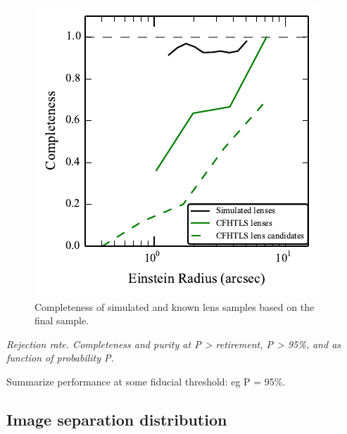 \documentclass[useAMS,usenatbib,a4paper]{mn2e}
\begin{document}
\begin{figure}
\begin{center}
\includegraphics[scale=1.0]{sw-cfhtls-figs/comp_reinst.pdf}
\caption{ \label{fig:compre} Completeness of simulated and known lens
samples based on the final \sw sample. }
\end{center}
\end{figure}


{\it Rejection rate. Completeness and purity at P > retirement, P > 95\%, and 
as function of probability P. 

Summarize performance at some fiducial threshold: eg P = 95\%.}

\subsection{Image separation distribution}
\label{sec:results:isd}
\end{document}
